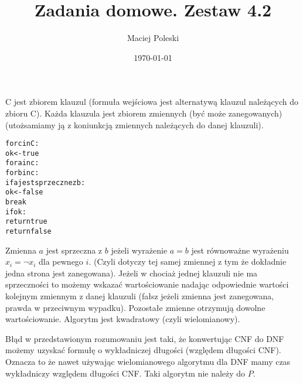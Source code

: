 \documentclass[a4paper,12pt]{article}
\title{Zadania domowe. Zestaw 4.2}
\author{Maciej Poleski}
\date{\today}
\begin{document}
\maketitle

\newpage

\section{}
\section{}
\section{}
\section{}
\section{}
\section{}
\section{}
C jest zbiorem klauzul (formuła wejściowa jest alternatywą klauzul należących do zbioru C). Każda klauzula jest zbiorem zmiennych (być może zanegowanych) (utożsamiamy ją z koniunkcją zmiennych należących do danej klauzuli).
\begin{alltt}
 for c in C:
    ok <- true
    for a in c:
        for b in c:
            if a jest sprzeczne z b:
                ok <- false
                break
    if ok:
        return true
 return false
\end{alltt}
 Zmienna $a$ jest sprzeczna z $b$ jeżeli wyrażenie $a=b$ jest równoważne wyrażeniu $x_i=\neg{x_i}$ dla pewnego $i$. (Czyli dotyczy tej samej zmiennej z tym że dokładnie jedna strona jest zanegowana). Jeżeli w chociaż jednej klauzuli nie ma sprzeczności to możemy wskazać wartościowanie nadając odpowiednie wartości kolejnym zmiennym z danej klauzuli (fałsz jeżeli zmienna jest zanegowana, prawda w przeciwnym wypadku). Pozostałe zmienne otrzymują dowolne wartościowanie. Algorytm jest kwadratowy (czyli wielomianowy).
 
 Błąd w przedstawionym rozumowaniu jest taki, że konwertując CNF do DNF możemy uzyskać formułę o wykładniczej długości (względem długości CNF). Oznacza to że nawet używając wielomianowego algorytmu dla DNF mamy czas wykładniczy względem długości CNF. Taki algorytm nie należy do $P$.
\end{document}

